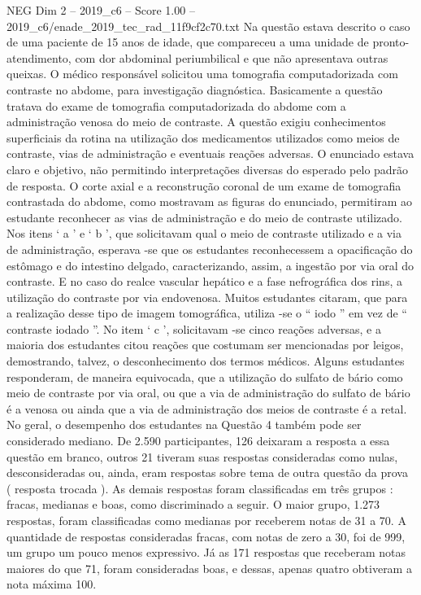 \begin{textsample}{NEG Dim 2 – 2019\_c6 – Score 1.00 – 2019\_c6/enade\_2019\_tec\_rad\_11f9cf2c70.txt}
Na questão estava descrito o caso de uma paciente de 15 anos de idade, que compareceu a uma unidade de pronto-atendimento, com dor abdominal periumbilical e que não apresentava outras queixas.
O médico responsável solicitou uma tomografia computadorizada com contraste no abdome, para investigação diagnóstica.
Basicamente a questão tratava do exame de tomografia computadorizada do abdome com a administração venosa do meio de contraste.
A questão exigiu conhecimentos superficiais da rotina na utilização dos medicamentos utilizados como meios de contraste, vias de administração e eventuais reações adversas.
O enunciado estava claro e objetivo, não permitindo interpretações diversas do esperado pelo padrão de resposta.
O corte axial e a reconstrução coronal de um exame de tomografia contrastada do abdome, como mostravam as figuras do enunciado, permitiram ao estudante reconhecer as vias de administração e do meio de contraste utilizado.
Nos itens ‘ a ’ e ‘ b ’, que solicitavam qual o meio de contraste utilizado e a via de administração, esperava -se que os estudantes reconhecessem a opacificação do estômago e do intestino delgado, caracterizando, assim, a ingestão por via oral do contraste.
E no caso do realce vascular hepático e a fase nefrográfica dos rins, a utilização do contraste por via endovenosa.
Muitos estudantes citaram, que para a realização desse tipo de imagem tomográfica, utiliza -se o “ iodo ” em vez de “ contraste iodado ”.
No item ‘ c ’, solicitavam -se cinco reações adversas, e a maioria dos estudantes citou reações que costumam ser mencionadas por leigos, demostrando, talvez, o desconhecimento dos termos médicos.
Alguns estudantes responderam, de maneira equivocada, que a utilização do sulfato de bário como meio de contraste por via oral, ou que a via de administração do sulfato de bário é a venosa ou ainda que a via de administração dos meios de contraste é a retal.
No geral, o desempenho dos estudantes na Questão 4 também pode ser considerado mediano.
De 2.590 participantes, 126 deixaram a resposta a essa questão em branco, outros 21 tiveram suas respostas consideradas como nulas, desconsideradas ou, ainda, eram respostas sobre tema de outra questão da prova ( resposta trocada ).
As demais respostas foram classificadas em três grupos : fracas, medianas e boas, como discriminado a seguir.
O maior grupo, 1.273 respostas, foram classificadas como medianas por receberem notas de 31 a 70.
A quantidade de respostas consideradas fracas, com notas de zero a 30, foi de 999, um grupo um pouco menos expressivo.
Já as 171 respostas que receberam notas maiores do que 71, foram consideradas boas, e dessas, apenas quatro obtiveram a nota máxima 100.

\end{textsample}
